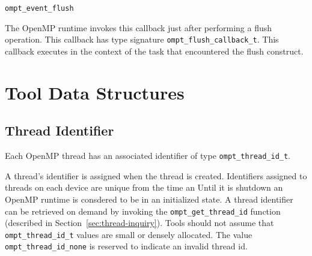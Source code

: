 \documentclass{article}
\newcommand{\descheader}[1]{{\needspace{3\baselineskip}\vspace{1em}\noindent \fbox{#1}}}
\begin{document}
\descheader{Miscellaneous}

\begin{description}

\item \verb|ompt_event_flush|

 \sloppy
   The OpenMP runtime invokes this callback just after
   performing a flush operation.  
   This callback has type signature \verb|ompt_flush_callback_t|. 
   This callback executes in the context of the task that encountered the flush construct.
\end{description}

\section{Tool Data Structures}
\label{sec:data}

\subsection{Thread Identifier}
  Each OpenMP thread  has an associated identifier of type \verb|ompt_thread_id_t|. 

  A thread's identifier is assigned when the thread is created. Identifiers assigned to threads on each device are unique from the time an 
  Until it is shutdown an OpenMP runtime is consdered to be in an initialized state.
  A thread identifier can be retrieved
  on demand by invoking the  \verb|ompt_get_thread_id|   
  function (described in Section~\ref{sec:thread-inquiry}).
  Tools should not assume that \verb|ompt_thread_id_t| values are small or densely allocated. 
  The value \verb|ompt_thread_id_none| is reserved to indicate an invalid thread id.
\end{document}
